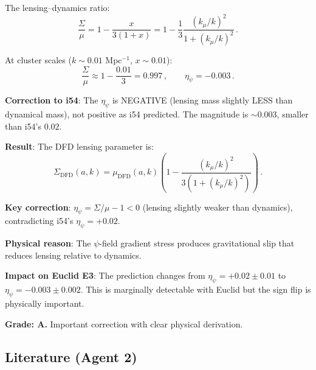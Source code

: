 \documentclass[11pt,a4paper]{article}
\begin{document}
The lensing--dynamics ratio:
\begin{equation}
\frac{\Sigma}{\mu} = 1 - \frac{x}{3(1+x)} = 1 - \frac{1}{3}\frac{(k_\mu/k)^2}{1 + (k_\mu/k)^2}\,.
\end{equation}

At cluster scales ($k \sim 0.01$ Mpc$^{-1}$, $x \sim 0.01$):
\begin{equation}
\frac{\Sigma}{\mu} \approx 1 - \frac{0.01}{3} = 0.997\,,\qquad \eta_\psi = -0.003\,.
\end{equation}

\textbf{Correction to i54}: The $\eta_\psi$ is NEGATIVE (lensing mass slightly LESS than dynamical mass), not positive as i54 predicted. The magnitude is $\sim 0.003$, smaller than i54's $0.02$.

\begin{tcolorbox}[colback=yellow!5!white, colframe=yellow!60!black, title={Agent 2: $\Sigma(a,k)$ --- CORRECTS i54}]
\textbf{Result}: The DFD lensing parameter is:
\begin{equation}
\Sigma_{\mathrm{DFD}}(a,k) = \mu_{\mathrm{DFD}}(a,k)\left(1 - \frac{(k_\mu/k)^2}{3(1 + (k_\mu/k)^2)}\right)\,.
\end{equation}

\textbf{Key correction}: $\eta_\psi = \Sigma/\mu - 1 < 0$ (lensing slightly weaker than dynamics), contradicting i54's $\eta_\psi = +0.02$.

\textbf{Physical reason}: The $\psi$-field gradient stress produces gravitational slip that reduces lensing relative to dynamics.

\textbf{Impact on Euclid E3}: The prediction changes from $\eta_\psi = +0.02 \pm 0.01$ to $\eta_\psi = -0.003 \pm 0.002$. This is marginally detectable with Euclid but the sign flip is physically important.

\textbf{Grade: A.} Important correction with clear physical derivation.
\end{tcolorbox}

\subsection{Literature (Agent 2)}
\end{document}
